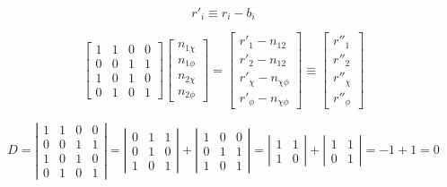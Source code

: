 \documentclass[a4paper]{article}
\begin{document}
\[
r'_i \equiv r_i - b_i
\]

\[
\left[
  \begin{array}{cccc}
    1 & 1 & 0 & 0\\
    0 & 0 & 1 & 1\\
    1 & 0 & 1 & 0\\
    0 & 1 & 0 & 1
  \end{array}
  \right]
\left[\begin{array}{c} n_{1\chi} \\ n_{1\phi} \\ n_{2\chi} \\ n_{2\phi}  \end{array}\right]
= 
\left[\begin{array}{c} r'_1 - n_{12}\\ r'_2 - n_{12}\\ r'_\chi - n_{\chi\phi}\\ r'_\phi - n_{\chi\phi} \end{array}\right]
\equiv 
\left[\begin{array}{c} r''_1\\ r''_2\\ r''_\chi\\ r''_\phi \end{array}\right]
\]

\[
D =
\left|
\begin{array}{cccc}
  1 & 1 & 0 & 0\\
  0 & 0 & 1 & 1\\
  1 & 0 & 1 & 0\\
  0 & 1 & 0 & 1
\end{array}
\right|
=
\left|
\begin{array}{ccc}
  0 & 1 & 1\\
  0 & 1 & 0\\
  1 & 0 & 1
\end{array}
\right|
+
\left|
\begin{array}{ccc}
  1 & 0 & 0\\
  0 & 1 & 1\\
  1 & 0 & 1
\end{array}
\right|
=
\left|
\begin{array}{cc}
  1 & 1\\
  1 & 0
\end{array}
\right|
+
\left|
\begin{array}{cc}
1 & 1\\
0 & 1
\end{array}
\right|
= -1 + 1 = 0
\]

\hline
\end{document}

